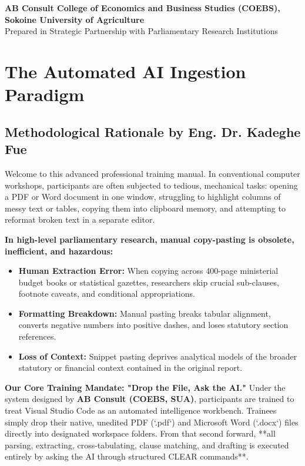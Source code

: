 \documentclass[11pt, a4paper]{report}
\begin{document}
\begin{titlepage}
    \vfill
    {\footnotesize \textbf{AB Consult \textbullet{} College of Economics and Business Studies (COEBS), Sokoine University of Agriculture}\\
    Prepared in Strategic Partnership with Parliamentary Research Institutions}
    \vspace*{0.2cm}
\end{titlepage}

\tableofcontents
\newpage

\chapter{The Automated AI Ingestion Paradigm}

\section{Methodological Rationale by Eng. Dr. Kadeghe Fue}
Welcome to this advanced professional training manual. In conventional computer workshops, participants are often subjected to tedious, mechanical tasks: opening a PDF or Word document in one window, struggling to highlight columns of messy text or tables, copying them into clipboard memory, and attempting to reformat broken text in a separate editor.

\textbf{In high-level parliamentary research, manual copy-pasting is obsolete, inefficient, and hazardous:}
\begin{itemize}[label=-]
    \item \textbf{Human Extraction Error:} When copying across 400-page ministerial budget books or statistical gazettes, researchers skip crucial sub-clauses, footnote caveats, and conditional appropriations.
    \item \textbf{Formatting Breakdown:} Manual pasting breaks tabular alignment, converts negative numbers into positive dashes, and loses statutory section references.
    \item \textbf{Loss of Context:} Snippet pasting deprives analytical models of the broader statutory or financial context contained in the original report.
\end{itemize}

\textbf{Our Core Training Mandate: "Drop the File, Ask the AI."}
Under the system designed by \textbf{AB Consult (COEBS, SUA)}, participants are trained to treat Visual Studio Code as an automated intelligence workbench. Trainees simply drop their native, unedited PDF (`.pdf`) and Microsoft Word (`.docx`) files directly into designated workspace folders. From that second forward, **all parsing, extracting, cross-tabulating, clause matching, and drafting is executed entirely by asking the AI through structured CLEAR commands**.
\end{document}
